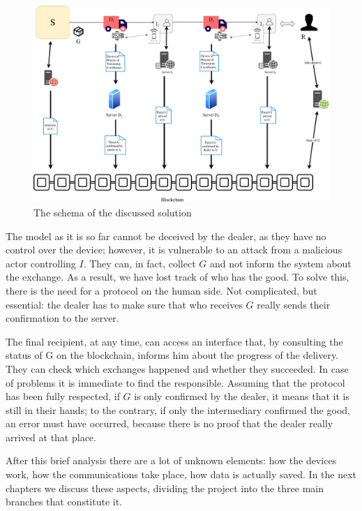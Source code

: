 \begin{figure}[h]
    \centering
    \includegraphics[width=\textwidth]{figures/solutionSansSerif.pdf}
    \caption{The schema of the discussed solution}
    \label{fig:solution}
\end{figure}

The model as it is so far cannot be deceived by the dealer, as they have no control over the device; however, it is vulnerable to an attack from a malicious actor controlling $I$. They can, in fact, collect $G$ and not inform the system about the exchange. As a result, we have lost track of who has the good. To solve this, there is the need for a protocol on the human side. Not complicated, but essential: the dealer has to make sure that who receives $G$ really sends their confirmation to the server. 

The final recipient, at any time, can access an interface that, by consulting the status of G on the blockchain, informs him about the progress of the delivery. They can check which exchanges happened and whether they succeeded. In case of problems it is immediate to find the responsible. Assuming that the protocol has been fully respected, if $G$ is only confirmed by the dealer, it means that it is still in their hands; to the contrary, if only the intermediary confirmed the good, an error must have occurred, because there is no proof that the dealer really arrived at that place.

After this brief analysis there are a lot of unknown elements: how the devices work, how the communications take place, how data is actually saved. In the next chapters we discuss these aspects, dividing the project into the three main branches that constitute it.


